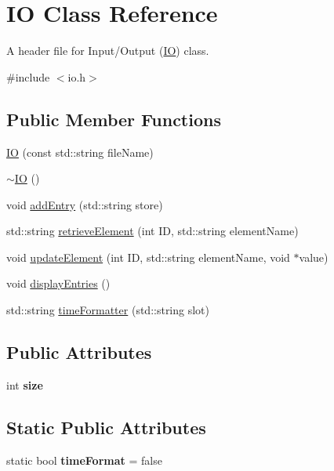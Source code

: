 \hypertarget{class_i_o}{}\section{IO Class Reference}
\label{class_i_o}


A header file for Input/\+Output (\mbox{\hyperlink{class_i_o}{IO}}) class.  




{\ttfamily \#include $<$io.\+h$>$}

\subsection*{Public Member Functions}
\begin{DoxyCompactItemize}
\item 
\mbox{\hyperlink{class_i_o_a98e1371822dc63d6b25c4153efd1bbf3}{IO}} (const std\+::string file\+Name)
\item 
\mbox{\hyperlink{class_i_o_a44861ff225d351615179f0f24cb8d7f6}{$\sim$\+IO}} ()
\item 
void \mbox{\hyperlink{class_i_o_aa3537c0737038acdc6c2963138bfabdf}{add\+Entry}} (std\+::string store)
\item 
std\+::string \mbox{\hyperlink{class_i_o_a3829dc8ad91e1f2d560be799b6d9b04d}{retrieve\+Element}} (int ID, std\+::string element\+Name)
\item 
void \mbox{\hyperlink{class_i_o_a11fdb7d4afa830fa1441fbf566f73432}{update\+Element}} (int ID, std\+::string element\+Name, void $\ast$value)
\item 
void \mbox{\hyperlink{class_i_o_a48e9febfbb2c6c3e01b467fd030c2529}{display\+Entries}} ()
\item 
std\+::string \mbox{\hyperlink{class_i_o_ad78c42847c70915fe94bddd25f716859}{time\+Formatter}} (std\+::string slot)
\end{DoxyCompactItemize}
\subsection*{Public Attributes}
\begin{DoxyCompactItemize}
\item 
\mbox{\label{class_i_o_a4e344c74454e6609b817e3fdb3fcddf3}} 
int {\bfseries size}
\end{DoxyCompactItemize}
\subsection*{Static Public Attributes}
\begin{DoxyCompactItemize}
\item 
\mbox{\label{class_i_o_a04cf024687a6a86007db5ecfcab69e5c}} 
static bool {\bfseries time\+Format} = false
\end{DoxyCompactItemize}


